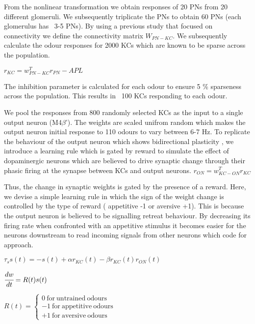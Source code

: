 From the nonlinear transformation we obtain  responses of 20 PNs from 20 different glomeruli. We subsequently triplicate the PNs to obtain 60 PNs (each glomerulus has ~3-5 PNs). By using a previous study that focused on connectivity \cite{23615618} we define the connectivity matrix $W_{PN-KC}$.  We subsequently calculate the odour responses for 2000 KCs which are known to be sparse across the population. 

 $r_{KC} = w^{T}_{PN-KC}r_{PN}-APL$

 \vspace{5 mm}

 The inhibition parameter is calculated for each odour to ensure 5 \% sparseness across the population. This results in ~100 KCs responding to each odour. 


 
 \vspace{5 mm}

We pool the responses from 800 randomly selected KCs as the input to a single output neuron (M4$\beta$'). The weights are scaled unifrom random which makes the output neuron initial response to 110 odours to  vary between 6-7 Hz. To replicate the behaviour of the output neuron which shows bidirectional plasticity  \cite{25864636}, we introduce a learning rule which is gated by reward to simulate the effect of dopaminergic neurons which are believed to drive synaptic change through their phasic firing at the synapse between KCs and output neurons. 
 \vspace{5 mm}
$r_{ON}  = w^{T}_{KC-ON}r_{KC}$

Thus, the change in synaptic weights is gated by the presence of a reward. Here, we devise a simple learning rule in which the sign of the weight change is controlled by the type of reward ( appetitive -1 or aversive +1). This is because the output neuron is believed to be signalling retreat behaviour. By decreasing its firing rate when confronted with an appetitive stimulus it becomes easier for the neurons downstream to read incoming  signals from other neurons which code for approach.

$\tau_{s}s(t)=-s(t)+\alpha r_{KC}(t)-\beta r_{KC}(t)r_{ON}(t)$
 
$\cfrac{dw}{dt}=R(t)s(t)$

 $R(t) =  \begin{cases} 0\:\mathrm{for\:untrained\:odours}\\-1\:\mathrm{for\:appetitive\:odours}\\+1\:\mathrm{for\:aversive\:odours} \end{cases}$
 
